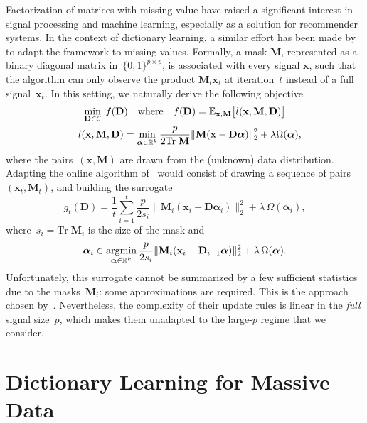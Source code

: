 \documentclass{article}
\def\E{{\mathbb E}}
\def\RR{{\mathbb{R}}}
\def\x{{\mathbf x}}
\def\D{{\mathbf D}}
\def\x{{\mathbf x}}
\def\M{{\mathbf M}}
\def\trace{{\mathrm{Tr}\;}}
\newcommand{\argmin}{\operatornamewithlimits{\mathrm{argmin}}}
\newcommand{\balpha}{\boldsymbol{\alpha}}
\begin{document}
Factorization of matrices with missing value have raised a significant interest in
 signal processing and machine learning, especially as a solution
for recommender systems.
In the context of dictionary learning, a similar effort has been made by~\citet{szabo_online_2011} to adapt the framework to missing
values. Formally, a mask $\M$, represented as a binary diagonal matrix in~$\{0,1\}^{p \times p}$, is
associated with every signal $\x$, such that the algorithm can only observe the product
$\M_t\x_t$ at iteration~$t$ instead of a full signal~$\x_t$.
In this setting, we naturally derive the following objective
\begin{gather}
\label{eq:expected_loss_masked}
\min_{\D\in \mathcal{C}} \; f(\D)\quad\text{where}\quad f(\D) = \E_{\x,\M} \bigl[l(\x, \M, \D)\bigr]
    \\
    \quad l(\x, \M, \D) = \min_{\balpha \in \RR^k} \frac{p}{2\trace{\M}}\Vert \M (\x - \D \balpha) \Vert_2^2
    + \lambda \Omega(\balpha), \notag
\end{gather}
where the pairs~$(\x,\M)$ are drawn from the (unknown) data distribution.
Adapting the online algorithm of~\citet{mairal_online_2010} would consist of
drawing a sequence of pairs~$(\x_t,\M_t)$, and building the surrogate
\begin{equation}
   g_t (\D) = \frac{1}{t} \sum_{i = 1}^t  \frac{p}{2s_i}\bigl\| \M_i(\x_i - \D \balpha_i)
	    \bigr\|_2^2
            +  \lambda \,\Omega(\balpha_i),\label{eq:surrogate_masked}
\end{equation}
where~$s_i= \trace{\M_i}$ is the size of the mask and
\begin{equation}
   \balpha_i \in \argmin_{\balpha \in \RR^k} \frac{p}{2s_i}\Vert \M_i (\x_i - \D_{i-1} \balpha) \Vert_2^2
   + \lambda\, \Omega(\balpha).\label{eq:alphaM}
\end{equation}
Unfortunately, this surrogate cannot be summarized by a few sufficient
statistics due to the masks~$\M_i$: some approximations are required.
This is the approach chosen by~\citet{szabo_online_2011}. Nevertheless, the
complexity of their update rules is linear in the \textit{full} signal size~$p$, which makes
them unadapted to the large-$p$ regime that we consider.






\section{Dictionary Learning for Massive Data}
\end{document}
